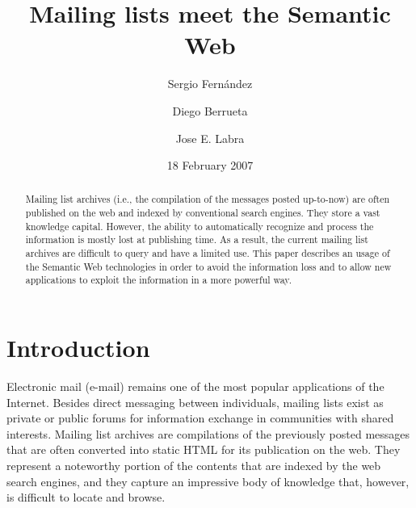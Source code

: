 \documentclass{llncs}
\begin{document}
\title{Mailing lists meet the Semantic Web}


\author{
Sergio Fern\'andez 
\and
Diego Berrueta 
\and
Jose E. Labra
}




\date{18 February 2007}

\maketitle

\begin{abstract}

Mailing list archives (i.e., the compilation of the messages posted up-to-now) are often 
published on the web and indexed by conventional search engines. They 
store a vast knowledge capital. However, the ability to automatically 
recognize and process the information is mostly lost at publishing time. 
As a result, the current mailing list archives are difficult to query and have 
a limited use. This paper describes an usage of the Semantic Web technologies 
in order to avoid the information loss and to allow new applications 
to exploit the information in a more powerful way.

\end{abstract}

\section{Introduction}

Electronic mail (e-mail) remains one of the most
popular applications of the Internet. Besides direct messaging
between individuals, mailing lists exist as private or public
forums for information exchange in communities with shared interests.
Mailing list archives are compilations of the previously posted
messages that are often converted into static HTML for its
publication on the web. They represent a noteworthy portion of
the contents that are indexed by the web search engines, and they
capture an impressive body of knowledge that, however, is difficult
to locate and browse.
\end{document}
